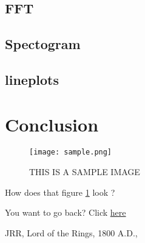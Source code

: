 \documentclass[11pt]{report}
\begin{document}
	\subsection{FFT}
	\subsection{Spectogram}
	\subsection{lineplots}
\section{Conclusion}
\clearpage
\begin{figure}
	\centering
	\texttt{[image: sample.png]}
	\caption{THIS IS A SAMPLE IMAGE}
	\label{fig:sample}
\end{figure}

How does that figure \ref{fig:sample} look \cite{ref1}?

You want to go back? Click \hyperlink{label}{here}
\clearpage

\begin{thebibliography}{}

JRR,
Lord of the Rings,
1800 A.D.,


\end{thebibliography}
\end{document}
